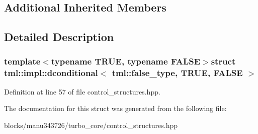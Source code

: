 \subsection*{Additional Inherited Members}


\subsection{Detailed Description}
\subsubsection*{template$<$typename T\+R\+U\+E, typename F\+A\+L\+S\+E$>$struct tml\+::impl\+::dconditional$<$ tml\+::false\+\_\+type, T\+R\+U\+E, F\+A\+L\+S\+E $>$}



Definition at line 57 of file control\+\_\+structures.\+hpp.



The documentation for this struct was generated from the following file\+:\begin{DoxyCompactItemize}
\item 
blocks/manu343726/turbo\+\_\+core/control\+\_\+structures.\+hpp\end{DoxyCompactItemize}
